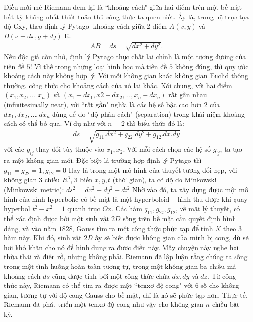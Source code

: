 \begin{multicols}{2}
	\vskip 0.1cm
	Điều mới mẻ Riemann đem lại là ``khoảng cách" giữa hai điểm trên một bề mặt bất kỳ không nhất thiết tuân thủ công thức ta quen biết. Ấy là, trong hệ trục tọa độ Oxy, theo định lý Pytago, khoảng cách giữa $2$ điểm $A(x, y)$ và $B(x + dx, y + dy)$ là:
	\begin{align*}
		AB = ds = \sqrt{dx ^2 + dy^2}.
	\end{align*} 
	Nếu độc giả còn nhớ, định lý Pytago thực chất lại chính là một tương đương của tiên đề $5$! Vì thế trong những loại hình học mà tiên đề $5$ không đúng, thì quy ước khoảng cách này không hợp lý. Với mỗi không gian khác không gian Euclid thông thường, công thức cho khoảng cách của nó lại khác. Nói chung, với hai điểm $(x_1, x_2, \ldots, x_n)$ và $(x_1 + dx_1, x2 + dx_2, \ldots, x_n + dx_n)$ rất gần nhau (infinitesimally near), với ``rất gần" nghĩa là các hệ số bậc cao hơn 2 của $dx_1, dx_2, \ldots, dx_n$ dùng để đo ``độ phân cách" (separation) trong khái niệm khoảng cách có thể bỏ qua. Ví dụ như với $n = 2$ thì biểu thức đó là:
	\begin{align*}
		ds = \sqrt{g_{11}.dx ^2 + g_{22}. dy ^2 + g_{12}. dx.dy}
	\end{align*}
	với các $g_{ij}$ thay đổi tùy thuộc vào $x_1, x_2$. Với mỗi cách chọn các hệ số $g_{ij}$, ta tạo ra một không gian mới. 
	\vskip 0.1cm
	Đặc biệt là trường hợp định lý Pytago thì  $g_{11} = g_{22} = 1, g_{12} = 0$
	\vskip 0.1cm
	Hay là trong một mô hình của thuyết tương đối hẹp, với không gian $3$ chiều $R^3$, $3$ biến $x, y, t$ (thời gian), ta có độ đo Minkowski (Minkowski metric): $ds^2 = dx ^2 + dy^2 - dt ^2$
	\vskip 0.1cm
	Nhờ vào đó, ta xây dựng được một mô hình của hình hyperbolic có bề mặt là một hyperboloid -- hình thu được khi quay hyperbol $t^2 - x^2 = 1$ quanh trục $Ox$.
	\vskip 0.1cm
	Các hàm $g_{11}, g_{22}, g_{12}$, về mặt lý thuyết, có thể xác định được bởi một sinh vật $2D$ sống trên bề mặt cần quyết định hình dáng, và vào năm $1828$, Gauss tìm ra một công thức phức tạp để tính $K$ theo $3$ hàm này. Khi đó, sinh vật $2D$ ấy sẽ biết được không gian của mình bị cong, dù sẽ hơi khó khăn cho nó để hình dung ra được điều này.
	\vskip 0.1cm
	Mấy chuyện này nghe hơi thừa thãi và điên rồ, nhưng không phải. Riemann đã lập luận rằng chúng ta sống trong một tình huống hoàn toàn tương tự, trong một không gian ba chiều mà khoảng cách $ds$ cũng được tính bởi một công thức chứa $dx, dy$ và $dz$. Từ công thức này, Riemann có thể tìm ra được một ``tenxơ độ cong" với $6$ số cho không gian, tương tự với độ cong Gauss cho bề mặt, chỉ là nó sẽ phức tạp hơn. Thực tế, Riemann đã phát triển một tenxơ độ cong như vậy cho không gian $n$ chiều bất kỳ.

\end{multicols}
